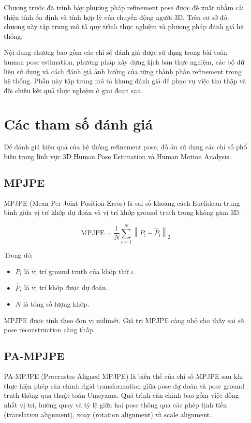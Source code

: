 \documentclass[../DoAn.tex]{subfiles}
\begin{document}
Chương trước đã trình bày phương pháp refinement pose được đề xuất nhằm cải thiện tính ổn định và tính hợp lý của chuyển động người 3D. Trên cơ sở đó, chương này tập trung mô tả quy trình thực nghiệm và phương pháp đánh giá hệ thống.

Nội dung chương bao gồm các chỉ số đánh giá được sử dụng trong bài toán human pose estimation, phương pháp xây dựng kịch bản thực nghiệm, các bộ dữ liệu sử dụng và cách đánh giá ảnh hưởng của từng thành phần refinement trong hệ thống. Phần này tập trung mô tả khung đánh giá để phục vụ việc thu thập và đối chiếu kết quả thực nghiệm ở giai đoạn sau.

\section{Các tham số đánh giá}

Để đánh giá hiệu quả của hệ thống refinement pose, đồ án sử dụng các chỉ số phổ biến trong lĩnh vực 3D Human Pose Estimation và Human Motion Analysis.

\subsection{MPJPE}

MPJPE (Mean Per Joint Position Error) là sai số khoảng cách Euclidean trung bình giữa vị trí khớp dự đoán và vị trí khớp ground truth trong không gian 3D.

\begin{equation}
\text{MPJPE} =
\frac{1}{N}
\sum_{i=1}^{N}
\left\|
P_i - \hat{P}_i
\right\|_2
\end{equation}

Trong đó:

\begin{itemize}
    \item $P_i$ là vị trí ground truth của khớp thứ $i$.
    \item $\hat{P}_i$ là vị trí khớp được dự đoán.
    \item $N$ là tổng số lượng khớp.
\end{itemize}

MPJPE được tính theo đơn vị milimét. Giá trị MPJPE càng nhỏ cho thấy sai số pose reconstruction càng thấp.

\subsection{PA-MPJPE}

PA-MPJPE (Procrustes Aligned MPJPE) là biến thể của chỉ số MPJPE sau khi thực hiện phép căn chỉnh rigid transformation giữa pose dự đoán và pose ground truth thông qua thuật toán Umeyama. Quá trình căn chỉnh bao gồm việc đồng nhất vị trí, hướng quay và tỷ lệ giữa hai pose thông qua các phép tịnh tiến (translation alignment), xoay (rotation alignment) và scale alignment. 
\end{document}
